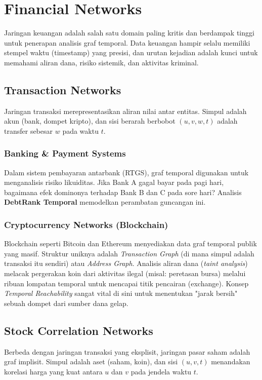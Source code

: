\documentclass[12pt,a4paper]{book}
\begin{document}
\chapter{Financial Networks}
Jaringan keuangan adalah salah satu domain paling kritis dan berdampak tinggi untuk penerapan analisis graf temporal. Data keuangan hampir selalu memiliki stempel waktu (timestamp) yang presisi, dan urutan kejadian adalah kunci untuk memahami aliran dana, risiko sistemik, dan aktivitas kriminal.

\section{Transaction Networks}
Jaringan transaksi merepresentasikan aliran nilai antar entitas. Simpul adalah akun (bank, dompet kripto), dan sisi berarah berbobot $(u, v, w, t)$ adalah transfer sebesar $w$ pada waktu $t$.

\subsection{Banking & Payment Systems}
Dalam sistem pembayaran antarbank (RTGS), graf temporal digunakan untuk menganalisis risiko likuiditas. Jika Bank A gagal bayar pada pagi hari, bagaimana efek dominonya terhadap Bank B dan C pada sore hari? Analisis \textbf{DebtRank Temporal} memodelkan perambatan guncangan ini.

\subsection{Cryptocurrency Networks (Blockchain)}
Blockchain seperti Bitcoin dan Ethereum menyediakan data graf temporal publik yang masif.
Struktur uniknya adalah \textit{Transaction Graph} (di mana simpul adalah transaksi itu sendiri) atau \textit{Address Graph}. Analisis aliran dana (\textit{taint analysis}) melacak pergerakan koin dari aktivitas ilegal (misal: peretasan bursa) melalui ribuan lompatan temporal untuk mencapai titik pencairan (exchange). Konsep \textit{Temporal Reachability} sangat vital di sini untuk menentukan "jarak bersih" sebuah dompet dari sumber dana gelap.

\section{Stock Correlation Networks}
Berbeda dengan jaringan transaksi yang eksplisit, jaringan pasar saham adalah graf implisit. Simpul adalah aset (saham, koin), dan sisi $(u, v, t)$ menandakan korelasi harga yang kuat antara $u$ dan $v$ pada jendela waktu $t$.
\end{document}

